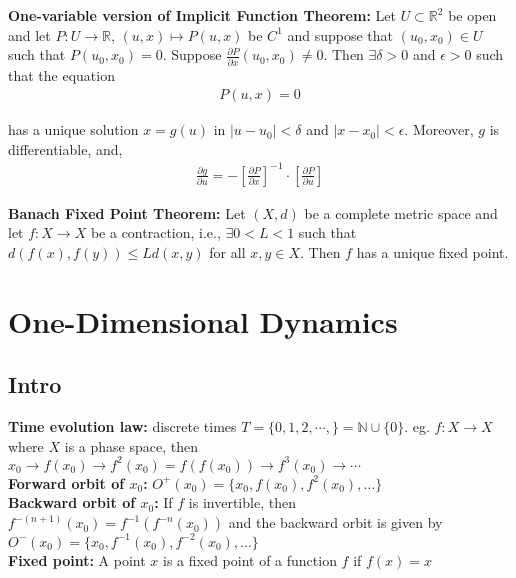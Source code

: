 \documentclass[12pt]{article}
\begin{document}
\textbf{One-variable version of Implicit Function Theorem:} Let $U \subset \mathbb{R}^2$ be open and let $P: U \to \mathbb{R}$, $(u, x) \mapsto P(u, x)$ be $C^1$ and suppose that $(u_0, x_0) \in U$ such that $P(u_0, x_0) = 0$. Suppose $\frac{\partial P}{\partial x}(u_0, x_0) \neq 0$. Then $\exists \delta > 0$ and $\epsilon > 0$ such that the equation
\begin{align*}
P(u, x) = 0
\end{align*}

has a unique solution $x = g(u)$ in $|u - u_0| < \delta$ and $|x - x_0| < \epsilon$. Moreover, $g$ is differentiable, and,
\begin{align*}
\frac{\partial g}{\partial u} = - \left[ \frac{\partial P}{\partial x} \right]^{-1} \cdot \left[ \frac{\partial P}{\partial u} \right]
\end{align*}

\textbf{Banach Fixed Point Theorem:} Let $(X, d)$ be a complete metric space and let $f: X \to X$ be a contraction, i.e., $\exists 0 < L < 1$ such that $d(f(x), f(y)) \leq Ld(x,y)$ for all $x, y \in X$. Then $f$ has a unique fixed point.

\newpage

\section{One-Dimensional Dynamics}

\subsection{Intro}

\textbf{Time evolution law:} discrete times $T = \{0, 1, 2, \cdots, \} = \mathbb{N} \cup \{0\}$.  eg. $f: X \to X$ where $X$ is a phase space, then $x_0 \to f(x_0) \to f^2(x_0) = f(f(x_0)) \to f^3(x_0) \to \cdots$\\

\textbf{Forward orbit of $x_0$:} $O^+(x_0) = \{x_0, f(x_0), f^2(x_0), \ldots \}$\\

\textbf{Backward orbit of $x_0$:} If $f$ is invertible, then $f^{-(n+1)}(x_0) = f^{-1}(f^{-n}(x_0))$ and the backward orbit is given by $O^{-}(x_0) = \{x_0, f^{-1}(x_0), f^{-2}(x_0), \ldots \}$\\

\textbf{Fixed point:} A point $x$ is a fixed point of a function $f$ if $f(x) = x$\\
\end{document}
